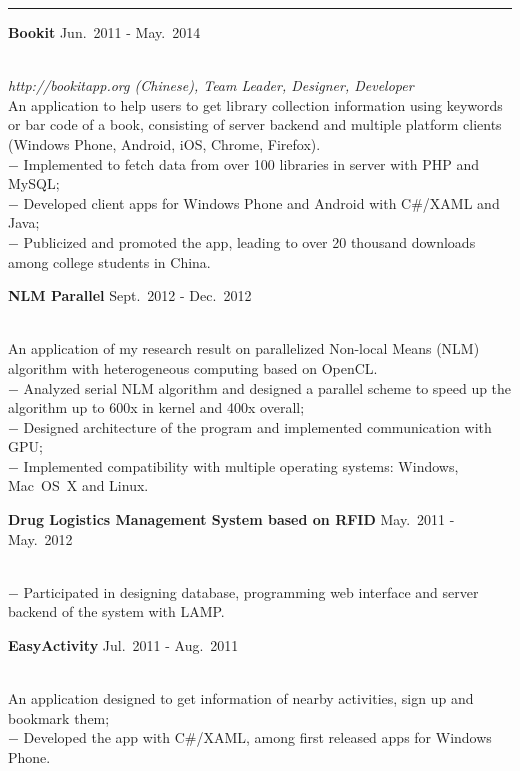 \documentclass[a4paper,10pt]{article}
\newcommand{\shadedsection}[1]{
    \setlength{\fboxsep}{0pt}
    \colorbox{shadecolor}{%
        \begin{minipage}{\linewidth}%
            \vspace{0.2em}%
            #1%
        \end{minipage}%
    }
}
\newenvironment{rSection}[1]{ %
  \medskip
  \hspace{-1.5em}{\color{Blue}\MakeUppercase{\large \bf {#1}}} %
  \vspace{-0.2em}
  \medskip
  \hrule %
  \begin{list}{}{ %
    \setlength{\leftmargin}{1.5em} %
  }
\setlength{\itemsep}{1pt}
  \item[]
}{
  \end{list}
}
\newcommand{\detail}[1]{{$-$ {#1}}}
\newcommand{\period}[3]{\normalsize {#1} \hfill {#2} - {#3}}
\begin{document}
\begin{rSection}{Relevant Projects}
  \vspace{-1.5em}
    
  \item
    \shadedsection{\period{\bf Bookit}{Jun.~2011}{May.~2014}}\\
    {\em http://bookitapp.org (Chinese), Team Leader, Designer, Developer}\\
    An application to help users to get library collection information using keywords or bar code of a book, consisting of server backend and multiple platform clients (Windows Phone, Android, iOS, Chrome, Firefox).\\
    \detail{Implemented to fetch data from over 100 libraries in server with PHP and MySQL;}\\
    \detail{Developed client apps for Windows Phone and Android with C\#/XAML and Java;}\\
    \detail{Publicized and promoted the app, leading to over 20 thousand downloads among college students in China.}
    
  \item
    \shadedsection{\period{\bf NLM Parallel}{Sept.~2012}{Dec.~2012}}\\
    An application of my research result on parallelized Non-local Means (NLM) algorithm with heterogeneous computing based on OpenCL.\\
    \detail{Analyzed serial NLM algorithm and designed a parallel scheme to speed up the algorithm up to 600x in kernel and 400x overall;}\\
    \detail{Designed architecture of the program and implemented communication with GPU;}\\
    \detail{Implemented compatibility with multiple operating systems: Windows, Mac~OS~X and Linux.}
    
  \item
    \shadedsection{\period{\bf Drug Logistics Management System based on RFID}{May.~2011}{May.~2012}}\\
    \detail{Participated in designing database, programming web interface and server backend of the system with LAMP.}

  \item
    \shadedsection{\period{\bf EasyActivity}{Jul.~2011}{Aug.~2011}}\\
    An application designed to get information of nearby activities, sign up and bookmark them;\\
    \detail{Developed the app with C\#/XAML, among first released apps for Windows Phone.}
\end{rSection}
\end{document}
